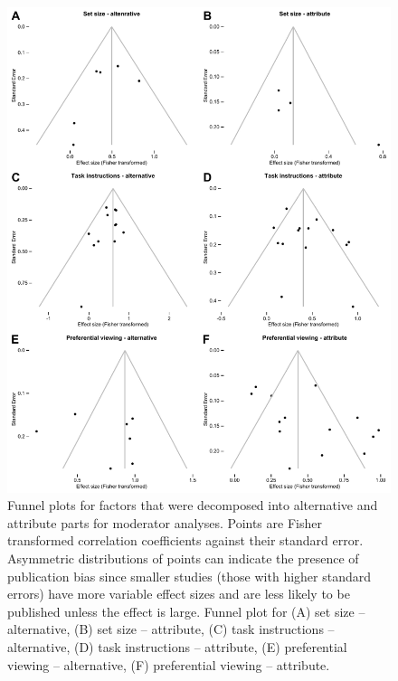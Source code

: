 \documentclass[english,natbib,man,floatsintext]{apa6}
\begin{document}
\begin{figure}%
\includegraphics{funnel_plots_altatt}
\centering
\singlespace
\caption{Funnel plots for factors that were decomposed into alternative and attribute parts for moderator analyses. Points are Fisher transformed correlation coefficients against their standard error. Asymmetric distributions of points can indicate the presence of publication bias since smaller studies (those with higher standard errors) have more variable effect sizes and are less likely to be published unless the effect is large. Funnel plot for (A) set size -- alternative, (B) set size -- attribute, (C) task instructions -- alternative, (D) task instructions -- attribute, (E) preferential viewing -- alternative, (F) preferential viewing -- attribute.}
\label{fig:funnel_plots_altatt}
\end{figure}
\clearpage
\end{document}
